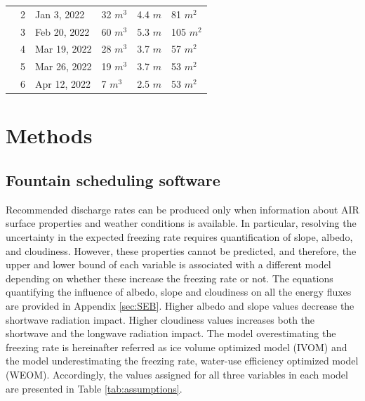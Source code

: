 \documentclass[tc, manuscript]{copernicus}
\begin{document}
\begin{table}
\begin{tabular}{@{}|llllll|@{}}
		\multicolumn{1}{|l|}{} & 2            & Jan 3, 2022   & 32 $m^{3}$      & 4.4 $m$
		                       & 81 $m^{2}$                                                                       \\
		\multicolumn{1}{|l|}{} & 3            & Feb 20, 2022   & 60 $m^{3}$      & 5.3 $m$
		                       & 105 $m^{2}$                                                                       \\
		\multicolumn{1}{|l|}{} & 4            & Mar 19, 2022   & 28 $m^{3}$      & 3.7 $m$
		                       & 57 $m^{2}$                                                                       \\
		\multicolumn{1}{|l|}{} & 5            & Mar 26, 2022   & 19 $m^{3}$      & 3.7 $m$
		                       & 53 $m^{2}$                                                                       \\
		\multicolumn{1}{|l|}{} & 6            & Apr 12, 2022   & 7 $m^{3}$      & 2.5 $m$
		                       & 53 $m^{2}$                                                                       \\
		\bottomrule
	\end{tabular}

\end{table}

\section{Methods}

\subsection{Fountain scheduling software}

Recommended discharge rates can be produced only when information about AIR surface properties and weather
conditions is available. In particular, resolving the uncertainty in the expected freezing rate requires
quantification of slope, albedo, and cloudiness. However, these properties cannot be predicted, and therefore,
the upper and lower bound of each variable is associated with a different model depending on whether these
increase the freezing rate or not. The equations quantifying the influence of albedo, slope and cloudiness on
all the energy fluxes are provided in Appendix \ref{sec:SEB}. Higher albedo and slope values decrease
the shortwave radiation impact. Higher cloudiness values increases both the shortwave and the longwave radiation
impact.  The model overestimating the freezing rate is hereinafter referred as ice volume optimized model (IVOM)
and the model underestimating the freezing rate, water-use efficiency optimized model (WEOM). Accordingly, the
values assigned for all three variables in each model are presented in Table \ref{tab:assumptions}.
\end{document}
